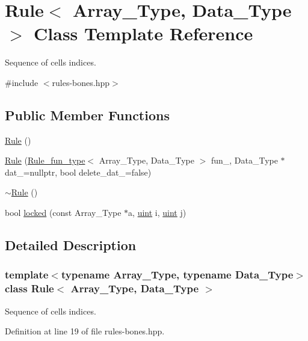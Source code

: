 \hypertarget{class_rule}{}\section{Rule$<$ Array\+\_\+\+Type, Data\+\_\+\+Type $>$ Class Template Reference}
\label{class_rule}


Sequence of cells indices.  




{\ttfamily \#include $<$rules-\/bones.\+hpp$>$}

\subsection*{Public Member Functions}
\begin{DoxyCompactItemize}
\item 
\hyperlink{class_rule_aef92e54d53dc77b5cad2f819b5f8f4bf}{Rule} ()
\item 
\hyperlink{class_rule_ad0b81db664bed03f9a381f90ab617424}{Rule} (\hyperlink{typedefs_8hpp_a2e147c9c0e8b65be614c98a5dd400d5c}{Rule\+\_\+fun\+\_\+type}$<$ Array\+\_\+\+Type, Data\+\_\+\+Type $>$ fun\+\_\+, Data\+\_\+\+Type $\ast$dat\+\_\+=nullptr, bool delete\+\_\+dat\+\_\+=false)
\item 
\hyperlink{class_rule_a9f7e4ac4893005c7d4ecc2781f0f727d}{$\sim$\+Rule} ()
\item 
bool \hyperlink{class_rule_a0a9a115c6951a5c8de699d4ff9f69060}{locked} (const Array\+\_\+\+Type $\ast$a, \hyperlink{typedefs_8hpp_a91ad9478d81a7aaf2593e8d9c3d06a14}{uint} i, \hyperlink{typedefs_8hpp_a91ad9478d81a7aaf2593e8d9c3d06a14}{uint} j)
\end{DoxyCompactItemize}


\subsection{Detailed Description}
\subsubsection*{template$<$typename Array\+\_\+\+Type, typename Data\+\_\+\+Type$>$\newline
class Rule$<$ Array\+\_\+\+Type, Data\+\_\+\+Type $>$}

Sequence of cells indices. 



Definition at line 19 of file rules-\/bones.\+hpp.



